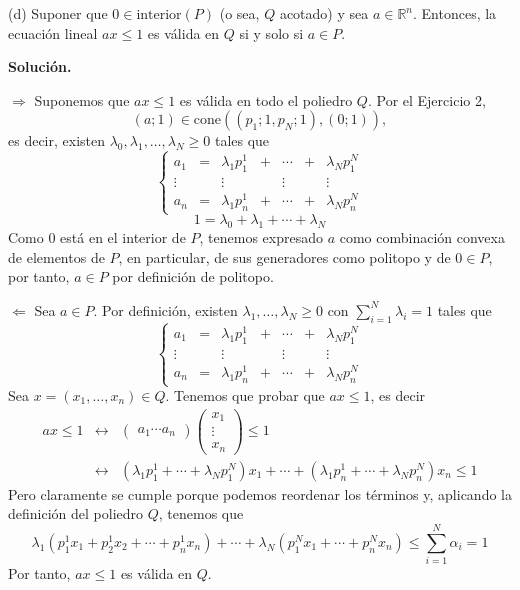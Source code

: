 \documentclass[10pt,a4paper]{article}
\begin{document}
(d) Suponer que $0\in\text{interior}(P)$ (o sea, $Q$ acotado) y sea $a\in\mathbb{R}^n$. Entonces, la ecuación lineal $ax\leq 1$ es válida en $Q$ si y solo si $a\in P$.


\textbf{Solución.}

$\Longrightarrow$ Suponemos que $ax\leq 1$ es válida en todo el poliedro $Q$. Por el Ejercicio 2,
$$(a;1)\in\text{cone}((p_1;1,p_N;1),(0;1)),$$
es decir, existen $\lambda_0,\lambda_1,\ldots,\lambda_N\geq 0$ tales que 
$$\left\{\begin{array}{ccccccc}a_1 & = & \lambda_1p_1^1 & + & \cdots & + & \lambda_Np_1^N\\
\vdots & & \vdots & & \vdots & & \vdots\\
a_n & = & \lambda_1p_n^1 & + & \cdots & + & \lambda_N p_n^N\end{array}\right.$$
$$1=\lambda_0+\lambda_1+\cdots+\lambda_N$$
Como $0$ está en el interior de $P$, tenemos expresado $a$ como combinación convexa de elementos de $P$, en particular, de sus generadores como politopo y de $0\in P$, por tanto, $a\in P$ por definición de politopo.

$\Longleftarrow$ Sea $a\in P$. Por definición, existen $\lambda_1,\ldots,\lambda_N\geq 0$ con $\sum\limits_{i=1}^N\lambda_i=1$ tales que
$$\left\{\begin{array}{ccccccc}a_1 & = & \lambda_1p_1^1 & + & \cdots & + & \lambda_Np_1^N\\
\vdots & & \vdots & & \vdots & & \vdots\\
a_n & = & \lambda_1p_n^1 & + & \cdots & + & \lambda_N p_n^N\end{array}\right.$$
Sea $x=(x_1,\ldots,x_n)\in Q$. Tenemos que probar que $ax\leq 1$, es decir
$$\begin{array}{rcl}ax\leq 1 & \longleftrightarrow & \begin{pmatrix}
a_1 \cdots  a_n\end{pmatrix}\begin{pmatrix}
x_1\\ \vdots\\ x_n
\end{pmatrix}\leq 1\\ & \longleftrightarrow & (\lambda_1p_1^1+\cdots+\lambda_Np_1^N)x_1+\cdots+(\lambda_1p_n^1+\cdots+\lambda_Np_n^N)x_n\leq 1\end{array}$$
Pero claramente se cumple porque podemos reordenar los términos y, aplicando la definición del poliedro $Q$, tenemos que 
$$\lambda_1(p_1^1x_1+p_2^1x_2+\cdots+p_n^1x_n)+\cdots+\lambda_N(p_1^Nx_1+\cdots+p_n^Nx_n)
\leq \sum\limits_{i=1}^N\alpha_i=1$$
Por tanto, $ax\leq 1$ es válida en $Q$.
\end{document}
